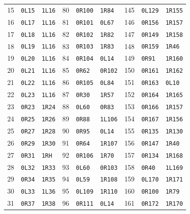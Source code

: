 {\begin{longtable}{@{}rll@{\hspace{1.8em}}rll@{\hspace{1.8em}}rll@{}}
15 & \texttt{0L15} & \texttt{1L16} & 80 & \texttt{0R100} & \texttt{1R84} & 145 & \texttt{0L129} & \texttt{1R155}\\
16 & \texttt{0L17} & \texttt{1L16} & 81 & \texttt{0R101} & \texttt{0L67} & 146 & \texttt{0R156} & \texttt{1R157}\\
17 & \texttt{0L18} & \texttt{1L16} & 82 & \texttt{0R102} & \texttt{1R82} & 147 & \texttt{0R149} & \texttt{1R158}\\
18 & \texttt{0L19} & \texttt{1L16} & 83 & \texttt{0R103} & \texttt{1R83} & 148 & \texttt{0R159} & \texttt{1R46}\\
19 & \texttt{0L20} & \texttt{1L16} & 84 & \texttt{0R104} & \texttt{0L14} & 149 & \texttt{0R91} & \texttt{1R160}\\
20 & \texttt{0L21} & \texttt{1L16} & 85 & \texttt{0R62} & \texttt{0R102} & 150 & \texttt{0R161} & \texttt{1R162}\\
21 & \texttt{0L22} & \texttt{1L16} & 86 & \texttt{0R105} & \texttt{0L84} & 151 & \texttt{0R163} & \texttt{0L10}\\
22 & \texttt{0L23} & \texttt{1L16} & 87 & \texttt{0R30} & \texttt{1R57} & 152 & \texttt{0R164} & \texttt{1R165}\\
23 & \texttt{0R23} & \texttt{1R24} & 88 & \texttt{0L60} & \texttt{0R83} & 153 & \texttt{0R166} & \texttt{1R157}\\
24 & \texttt{0R25} & \texttt{1R26} & 89 & \texttt{0R88} & \texttt{1L106} & 154 & \texttt{0R167} & \texttt{1R156}\\
25 & \texttt{0R27} & \texttt{1R28} & 90 & \texttt{0R95} & \texttt{0L14} & 155 & \texttt{0R135} & \texttt{1R130}\\
26 & \texttt{0R29} & \texttt{1R30} & 91 & \texttt{0R64} & \texttt{1R107} & 156 & \texttt{0R147} & \texttt{1R40}\\
27 & \texttt{0R31} & \texttt{1RH} & 92 & \texttt{0R106} & \texttt{1R70} & 157 & \texttt{0R134} & \texttt{1R168}\\
28 & \texttt{0L32} & \texttt{1R33} & 93 & \texttt{0L60} & \texttt{0R103} & 158 & \texttt{0R40} & \texttt{1L169}\\
29 & \texttt{0R34} & \texttt{1R35} & 94 & \texttt{0L59} & \texttt{1R108} & 159 & \texttt{0L170} & \texttt{1R171}\\
30 & \texttt{0L33} & \texttt{1L36} & 95 & \texttt{0L109} & \texttt{1R110} & 160 & \texttt{0R100} & \texttt{1R79}\\
31 & \texttt{0R37} & \texttt{1R38} & 96 & \texttt{0R111} & \texttt{0L14} & 161 & \texttt{0R172} & \texttt{1R170}\\

\end{longtable}}
